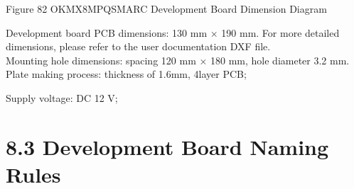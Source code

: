 \documentclass[letterpaper,10pt,openany,english]{sphinxmanual}
\begin{document}
\sphinxAtStartPar
Figure 8\sphinxhyphen{}2 OK\sphinxhyphen{}MX8MPQ\sphinxhyphen{}SMARC Development Board Dimension Diagram

\sphinxAtStartPar
Development board PCB dimensions: 130 mm × 190 mm. For more detailed dimensions, please refer to the user documentation DXF file.\\
Mounting hole dimensions: spacing 120 mm × 180 mm, hole diameter 3.2 mm. Plate making process: thickness of 1.6mm, 4\sphinxhyphen{}layer PCB;

\sphinxAtStartPar
Supply voltage: DC 12 V;


\section{8.3 Development Board Naming Rules}
\label{\detokenize{hardware:development-board-naming-rules}}
\end{document}
